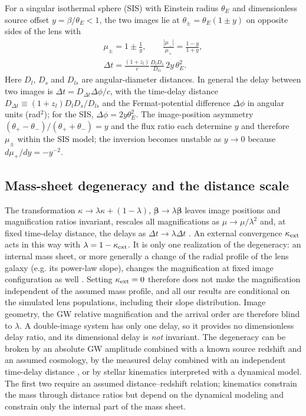 For a singular isothermal sphere (SIS) with Einstein radius $\theta_E$ and dimensionless source offset $y=\beta/\theta_E<1$, the two images lie at $\theta_\pm=\theta_E(1\pm y)$ on opposite sides of the lens with
\begin{equation}
\begin{gathered}
\mu_\pm=1\pm\frac1y,\qquad \frac{|\mu_-|}{\mu_+}=\frac{1-y}{1+y},\\
\Delta t=\frac{(1+z_l)}{c}\frac{D_lD_s}{D_{ls}}\,2y\,\theta_E^2 .
\end{gathered}
\label{eq:sis}
\end{equation}
Here $D_l$, $D_s$ and $D_{ls}$ are angular-diameter distances. In general the delay between two images is $\Delta t=D_{\Delta t}\Delta\phi/c$, with the time-delay distance $D_{\Delta t}\equiv(1+z_l)D_lD_s/D_{ls}$ and the Fermat-potential difference $\Delta\phi$ in angular units (rad$^2$); for the SIS, $\Delta\phi=2y\theta_E^2$. The image-position asymmetry $(\theta_+-\theta_-)/(\theta_++\theta_-)=y$ and the flux ratio each determine $y$ and therefore $\mu_\pm$ within the SIS model; the inversion becomes unstable as $y\to0$ because $d\mu_+/dy=-y^{-2}$.

\subsection{Mass-sheet degeneracy and the distance scale}
\label{sec:msd}
The transformation $\kappa\to\lambda\kappa+(1-\lambda)$, $\boldsymbol\beta\to\lambda\boldsymbol\beta$ leaves image positions and magnification ratios invariant, rescales all magnifications as $\mu\to\mu/\lambda^2$ and, at fixed time-delay distance, the delays as $\Delta t\to\lambda\Delta t$ \citep{falco1985msd,schneider2013msd}. An external convergence $\kappa_{\rm ext}$ acts in this way with $\lambda=1-\kappa_{\rm ext}$. It is only one realization of the degeneracy: an internal mass sheet, or more generally a change of the radial profile of the lens galaxy (e.g. its power-law slope), changes the magnification at fixed image configuration as well \citep{schneider2013msd}. Setting $\kappa_{\rm ext}=0$ therefore does not make the magnification independent of the assumed mass profile, and all our results are conditional on the simulated lens populations, including their slope distribution. Image geometry, the GW relative magnification and the arrival order are therefore blind to $\lambda$. A double-image system has only one delay, so it provides no dimensionless delay ratio, and its dimensional delay is \emph{not} invariant. The degeneracy can be broken by an absolute GW amplitude combined with a known source redshift and an assumed cosmology, by the measured delay combined with an independent time-delay distance \citep{poon2025degeneracy}, or by stellar kinematics interpreted with a dynamical model. The first two require an assumed distance--redshift relation; kinematics constrain the mass through distance ratios but depend on the dynamical modeling and constrain only the internal part of the mass sheet.

